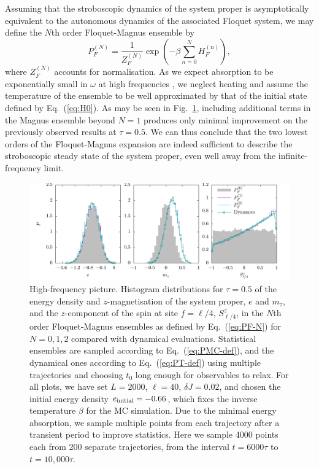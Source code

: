 \documentclass[aps,pre,twocolumn,notitlepage,floats,10pt]{revtex4-1}
\newcommand{\be}{\begin{equation}}
\newcommand{\ee}{\end{equation}}
\begin{document}
Assuming that the stroboscopic dynamics of the system proper is asymptotically
equivalent to the autonomous dynamics of the associated Floquet system, we may
define the $N$th order Floquet-Magnus ensemble by
\be
P_F^{(N)} = \frac{1}{Z_F^{(N)}} \exp\left(-\beta \sum_{n=0}^N H_F^{(n)}\right),
\label{eq:PF-N}
\ee
where $Z_F^{(N)}$ accounts for normalisation.
As we expect absorption to be exponentially small in $\omega$ at high
frequencies \cite{rubio-abadal}, we neglect heating and assume the temperature
of the ensemble to be well approximated by that of the initial state defined by
Eq.~(\ref{eq:H0}).
As may be seen in Fig.~\ref{fig:high-freq-2nd-order}, including additional terms
in the Magnus ensemble beyond $N=1$ produces only minimal improvement on the
previously observed results at $\tau = 0.5$.
We can thus conclude that the two lowest orders of the Floquet-Magnus expansion
are indeed sufficient to describe the stroboscopic steady state of the system
proper, even well away from the infinite-frequency limit.

\begin{figure}[!ht]
  \includegraphics[width=.95\linewidth]{figs/fig-3-high-frequency-histograms.pdf}
  \caption{
  High-frequency picture.
  Histogram distributions for $\tau = 0.5$ of the energy density and
  $z$-magnetisation of the system proper, $e$ and $m_z$, and the
  $z$-component of the spin at site $f=\ell/4$, $S^z_{\ell/4}$, in the
  $N$th order Floquet-Magnus ensembles as defined by Eq.~(\ref{eq:PF-N})
  for $N=0,1,2$ compared with dynamical evaluations.
  Statistical ensembles are sampled according to
  Eq.~(\ref{eq:PMC-def}), and the dynamical ones according to
  Eq.~(\ref{eq:PT-def}) using multiple trajectories and choosing $t_0$
  long enough for observables to relax.
  For all plots, we have set $L=2000$, $\ell=40$, $\delta J = 0.02$, and
  chosen the initial energy density $e_{\rm initial}=-0.66$, which fixes
  the inverse temperature $\beta$ for the MC simulation.
  Due to the minimal energy absorption, we sample multiple points from
  each trajectory after a transient period to improve statistics.
  Here we sample 4000 points each from 200 separate trajectories, from the
  interval $t=6000\tau$ to $t=10,000\tau$.
  }
  \label{fig:high-freq-2nd-order}
\end{figure}
\end{document}
